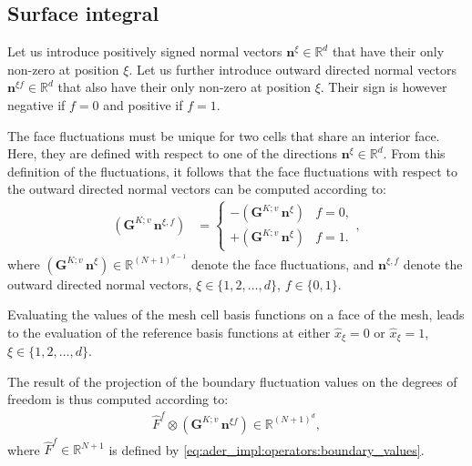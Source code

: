 \documentclass{scrreprt}
\theoremstyle{definition}
\theoremstyle{nonumberplain}
\renewcommand{\vec}[1]{{\textbf{#1}}}
\newcommand{\cell}{K}
\begin{document}
\subsection{Surface integral}
Let us introduce positively signed normal vectors $\vec{n}^{\xi}\in\mathbb{R}^d$
that have their only non-zero at position $\xi$.
Let us further introduce outward directed normal vectors $\vec{n}^{\xi
f}\in\mathbb{R}^d$ that also have their only non-zero at position $\xi$. Their
sign is however negative if $f=0$ and positive if $f=1$.

The face fluctuations must be unique for two cells that share an interior
face. Here, they are defined with respect to one of the directions
$\vec{n}^{\xi}\in\mathbb{R}^d$.
From this definition of the fluctuations, it follows that
the face fluctuations with respect to the outward directed
normal vectors can be computed according to:
\begin{align}
(\vec{G}^{\cell;v}\,\vec{n}^{\xi, f})
&=
\begin{cases}
-(\vec{G}^{\cell;v}\,\vec{n}^{\xi}) & f=0, \\
+(\vec{G}^{\cell;v}\,\vec{n}^{\xi}) & f=1.
\end{cases},
\end{align}
where $(\vec{G}^{\cell;v}\,\vec{n}^{\xi})\in\mathbb{R}^{(N+1)^{d-1}}$
denote the face fluctuations, and $\vec{n}^{\xi, f}$ denote the
outward directed normal vectors, $\xi\in\{1,2,\ldots,d\}$, $f\in\{0,1\}$.

Evaluating the values of the mesh cell basis functions on a face of the mesh,
leads to the evaluation of the reference basis functions at
either $\hat{x}_\xi=0$ or $\hat{x}_\xi=1$, $\xi\in\{1,2,\ldots,d\}$.

The result of the projection of the boundary fluctuation values on the
degrees of freedom is thus computed according to:
\begin{align}
\hat{F}^f\otimes(\vec{G}^{\cell;v}\,\vec{n}^{\xi
f})\in\mathbb{R}^{(N+1)^d},
\end{align}
where $\hat{F}^f\in\mathbb{R}^{N+1}$ is defined
by \eqref{eq:ader_impl:operators:boundary_values}.
\end{document}
